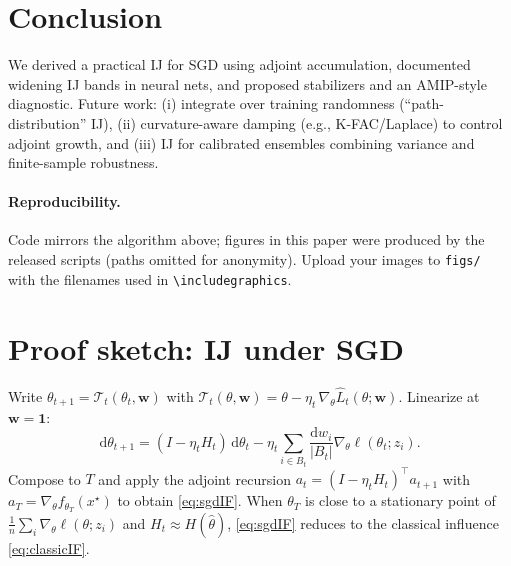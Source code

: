 \documentclass[11pt]{article}
\begin{document}
\section{Conclusion}
We derived a practical IJ for SGD using adjoint accumulation, documented widening IJ bands in neural nets, and proposed stabilizers and an AMIP-style diagnostic. Future work: (i) integrate over training randomness (``path-distribution'' IJ), (ii) curvature-aware damping (e.g., K-FAC/Laplace) to control adjoint growth, and (iii) IJ for calibrated ensembles combining variance and finite-sample robustness.

\paragraph{Reproducibility.}
Code mirrors the algorithm above; figures in this paper were produced by the released scripts (paths omitted for anonymity). Upload your images to \texttt{figs/} with the filenames used in \verb|\includegraphics|.




\appendix
\section{Proof sketch: IJ under SGD}
Write $\theta_{t+1}=\mathcal{T}_t(\theta_t,\mathbf{w})$ with $\mathcal{T}_t(\theta,\mathbf{w})=\theta-\eta_t\,\nabla_\theta \widehat{L}_t(\theta;\mathbf{w})$. Linearize at $\mathbf{w}=\mathbf{1}$:
\[
\mathrm{d}\theta_{t+1}=(I-\eta_t H_t)\,\mathrm{d}\theta_t-\eta_t\sum_{i\in B_t}\frac{\mathrm{d}w_i}{|B_t|}\nabla_\theta \ell(\theta_t;z_i).
\]
Compose to $T$ and apply the adjoint recursion $a_t=(I-\eta_t H_t)^\top a_{t+1}$ with $a_T=\nabla_\theta f_{\theta_T}(x^\star)$ to obtain \eqref{eq:sgdIF}. When $\theta_T$ is close to a stationary point of $\frac{1}{n}\sum_i \nabla_\theta \ell(\theta;z_i)$ and $H_t\approx H(\hat\theta)$, \eqref{eq:sgdIF} reduces to the classical influence \eqref{eq:classicIF}.
\end{document}
